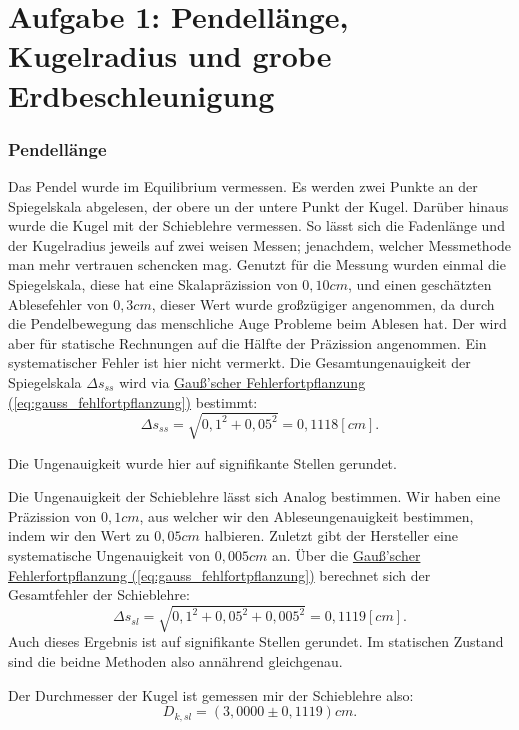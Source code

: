 \twocolumn

\section{Aufgabe 1: Pendellänge, Kugelradius und grobe Erdbeschleunigung}
\subsubsection*{Pendellänge}
Das Pendel wurde im Equilibrium vermessen. Es werden zwei Punkte an der Spiegelskala abgelesen, der obere un der untere Punkt der Kugel. Darüber hinaus wurde die Kugel mit der Schieblehre vermessen. So lässt sich die Fadenlänge und der Kugelradius jeweils auf zwei weisen Messen; jenachdem, welcher Messmethode man mehr vertrauen schencken mag.
Genutzt für die Messung wurden einmal die Spiegelskala, diese hat eine Skalapräzission von $0,10cm$, und einen geschätzten Ablesefehler von $0,3cm$, dieser Wert wurde großzügiger angenommen, da durch die Pendelbewegung das menschliche Auge Probleme beim Ablesen hat. Der wird aber für statische Rechnungen auf die Hälfte der Präzission angenommen. Ein systematischer Fehler ist hier nicht vermerkt. Die Gesamtungenauigkeit der Spiegelskala $\Delta s_{ss}$ wird via \hyperref[eq:gauss_fehlfortpflanzung]{Gauß'scher Fehlerfortpflanzung (\ref*{eq:gauss_fehlfortpflanzung})} bestimmt:
\begin{equation}
    \Delta s_{ss} = \sqrt{0,1^2+0,05^2} = 0,1118 [cm].
\end{equation}

Die Ungenauigkeit wurde hier auf signifikante Stellen gerundet.

Die Ungenauigkeit der Schieblehre lässt sich Analog bestimmen. Wir haben eine Präzission von $0,1cm$, aus welcher wir den Ableseungenauigkeit bestimmen, indem wir den Wert zu $0,05cm$ halbieren. Zuletzt gibt der Hersteller eine systematische Ungenauigkeit von $0,005cm$ an. Über die \hyperref[eq:gauss_fehlfortpflanzung]{Gauß'scher Fehlerfortpflanzung (\ref*{eq:gauss_fehlfortpflanzung})} berechnet sich der Gesamtfehler der Schieblehre:
\begin{equation}
    \Delta s_{sl} = \sqrt{0,1^2+0,05^2+0,005^2} = 0,1119 [cm].
\end{equation}
Auch dieses Ergebnis ist auf signifikante Stellen gerundet. Im statischen Zustand sind die beidne Methoden also annährend gleichgenau.

Der Durchmesser der Kugel ist gemessen mir der Schieblehre also:
\begin{equation}
    D_{k,sl} = (3,0000 \pm 0,1119)cm.
\end{equation}

